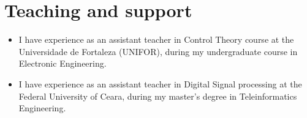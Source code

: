 \section{Teaching and support}
\begin{itemize}[leftmargin=0.15in, label={}] %
    \item I have experience as an assistant teacher in Control Theory course at the Universidade de Fortaleza (UNIFOR), during my undergraduate course in Electronic Engineering.
    \item I have experience as an assistant teacher in Digital Signal processing at the Federal University of Ceara, during my master's degree in Teleinformatics Engineering. 
\end{itemize}